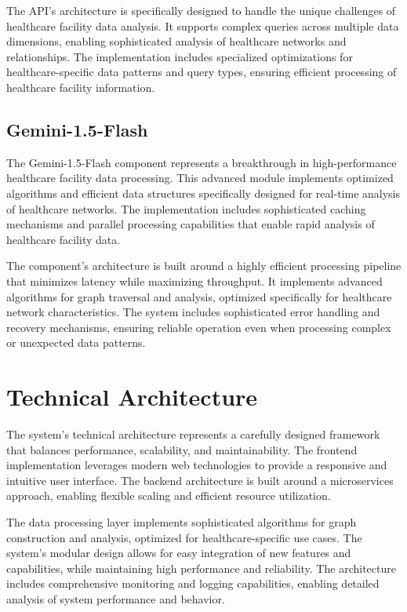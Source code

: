 \documentclass[12pt,a4paper]{report}
\begin{document}
The API's architecture is specifically designed to handle the unique challenges of healthcare facility data analysis. It supports complex queries across multiple data dimensions, enabling sophisticated analysis of healthcare networks and relationships. The implementation includes specialized optimizations for healthcare-specific data patterns and query types, ensuring efficient processing of healthcare facility information.

\subsection{Gemini-1.5-Flash}
The Gemini-1.5-Flash component represents a breakthrough in high-performance healthcare facility data processing. This advanced module implements optimized algorithms and efficient data structures specifically designed for real-time analysis of healthcare networks. The implementation includes sophisticated caching mechanisms and parallel processing capabilities that enable rapid analysis of healthcare facility data.

The component's architecture is built around a highly efficient processing pipeline that minimizes latency while maximizing throughput. It implements advanced algorithms for graph traversal and analysis, optimized specifically for healthcare network characteristics. The system includes sophisticated error handling and recovery mechanisms, ensuring reliable operation even when processing complex or unexpected data patterns.

\section{Technical Architecture}
The system's technical architecture represents a carefully designed framework that balances performance, scalability, and maintainability. The frontend implementation leverages modern web technologies to provide a responsive and intuitive user interface. The backend architecture is built around a microservices approach, enabling flexible scaling and efficient resource utilization.

The data processing layer implements sophisticated algorithms for graph construction and analysis, optimized for healthcare-specific use cases. The system's modular design allows for easy integration of new features and capabilities, while maintaining high performance and reliability. The architecture includes comprehensive monitoring and logging capabilities, enabling detailed analysis of system performance and behavior.
\end{document}
